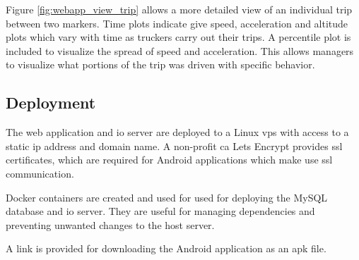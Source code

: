 Figure \ref{fig:webapp_view_trip} allows a more detailed view of an individual trip between two markers.
Time plots indicate give speed, acceleration and altitude plots which vary with time as truckers carry out their trips.
A percentile plot is included to visualize the spread of speed and acceleration.
This allows managers to visualize what portions of the trip was driven with specific behavior.

\subsection{Deployment}
The web application and \ac{io} server are deployed to a Linux \ac{vps} with access to a static \ac{ip} address and domain name.
A non-profit \ac{ca} Lets Encrypt provides \ac{ssl} certificates, which are required for Android applications which make use \ac{ssl} communication.

Docker containers are created and used for used for deploying the MySQL database and \ac{io} server. 
They are useful for managing dependencies and preventing unwanted changes to the host server.

A link is provided for downloading the Android application as an \ac{apk} file.

\pagebreak
